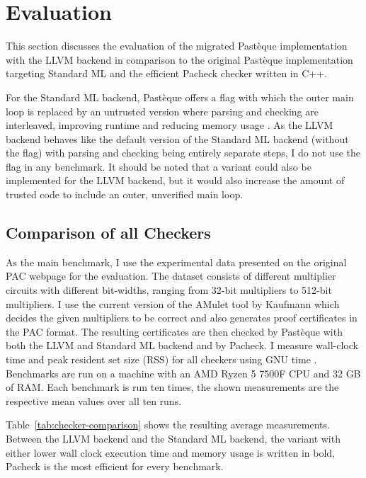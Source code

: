 \section{Evaluation}\label{sec:evaluation}

This section discusses the evaluation of the migrated Pastèque implementation with the LLVM backend in comparison to the original Pastèque implementation targeting Standard ML \cite{pac-2024} and the efficient Pacheck \cite{pac-2024} checker written in C++.

For the Standard ML backend, Pastèque offers a  flag with which the outer main loop is replaced by an untrusted version where parsing and checking are interleaved, improving runtime and reducing memory usage \cite{pac-2024}.
As the LLVM backend behaves like the default version of the Standard ML backend (without the  flag) with parsing and checking being entirely separate steps, I do not use the  flag in any benchmark.
It should be noted that a  variant could also be implemented for the LLVM backend, but it would also increase the amount of trusted code to include an outer, unverified main loop.

\subsection{Comparison of all Checkers}\label{sec:comparison-of-all-checkers}

As the main benchmark, I use the experimental data presented on the original PAC webpage \cite{pacheck_pasteque} for the evaluation.
The dataset consists of different multiplier circuits with different bit-widths, ranging from 32-bit multipliers to 512-bit multipliers.
I use the current version of the AMulet tool by Kaufmann \cite{amulet2} which decides the given multipliers to be correct and also generates proof certificates in the PAC format.
The resulting certificates are then checked by Pastèque with both the LLVM and Standard ML backend and by Pacheck.
I measure wall-clock time and peak resident set size (RSS) for all checkers using GNU time \cite{gnutime}.
Benchmarks are run on a machine with an AMD Ryzen 5 7500F CPU and 32 GB of RAM.
Each benchmark is run ten times, the shown measurements are the respective mean values over all ten runs.


Table~\ref{tab:checker-comparison} shows the resulting average measurements.
Between the LLVM backend and the Standard ML backend, the variant with either lower wall clock execution time and memory usage is written in bold, Pacheck is the most efficient for every benchmark.

